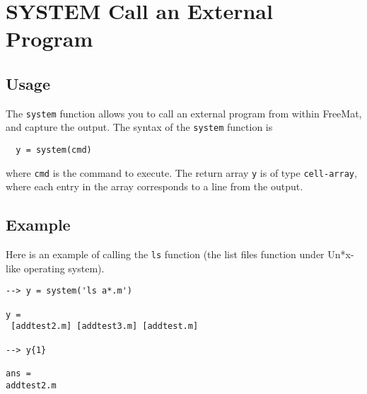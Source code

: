 \section{SYSTEM Call an External Program}

\subsection{Usage}

The \verb|system| function allows you to call an external
program from within FreeMat, and capture the output.
The syntax of the \verb|system| function is
\begin{verbatim}
  y = system(cmd)
\end{verbatim}
where \verb|cmd| is the command to execute.  The return
array \verb|y| is of type \verb|cell-array|, where each entry
in the array corresponds to a line from the output.
\subsection{Example}

Here is an example of calling the \verb|ls| function (the
list files function under Un*x-like operating system).
\begin{verbatim}
--> y = system('ls a*.m')

y = 
 [addtest2.m] [addtest3.m] [addtest.m] 

--> y{1}

ans = 
addtest2.m
\end{verbatim}
